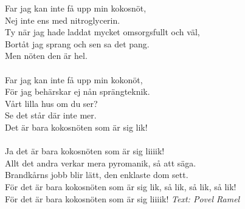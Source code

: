Far jag kan inte få upp min kokosnöt,\\
Nej inte ens med nitroglycerin.\\
Ty när jag hade laddat mycket omsorgsfullt och väl,\\
Bortåt jag sprang och sen sa det pang.\\
Men nöten den är hel.\\
\\
Far jag kan inte få upp min kokonöt,\\
För jag behärskar ej nån sprängteknik.\\
Vårt lilla hus om du ser?\\
Se det står där inte mer.\\
Det är bara kokosnöten som är sig lik!\\
\\
Ja det är bara kokosnöten som är sig liiiik!\\
Allt det andra verkar mera pyromanik, så att säga.\\
Brandkårns jobb blir lätt, den enklaste dom sett.\\
För det är bara kokosnöten som är sig lik, så lik, så lik, så lik!\\
För det är bara kokosnöten som är sig liiiik!
\vspace{10pt}
{\footnotesize\textit{Text: Povel Ramel}}
